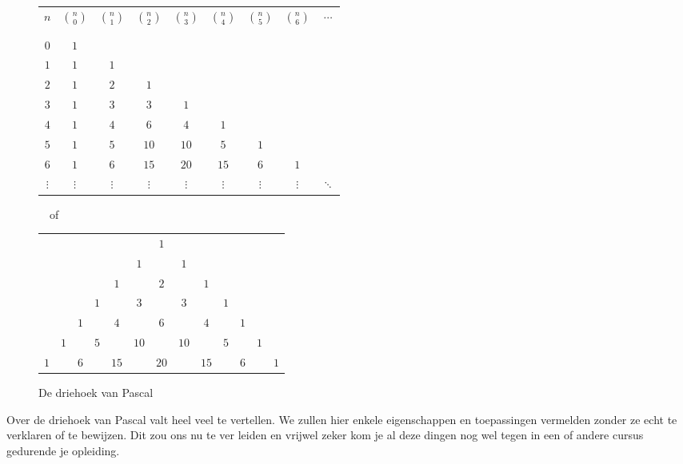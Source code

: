 \documentclass{ximera}
\begin{document}
\begin{figure}
\addtolength{\parindent}{-1.85cm}
\begin{tabular}{c|cccccccc}
$n$ & ${n\choose0}$ & ${n\choose1}$ & ${n\choose2}$ & ${n\choose3}$ & ${n\choose4}$ & ${n\choose5}$ & ${n\choose6}$ & $\cdots$ \\\\[-2.1ex]
\hline\\[-2.1ex]
$0$ & $1$ &  &  &  &  & & & \\
$1$ & $1$ & $1$ &  &  &  &  & &  \\
$2$ & $1$ & $2$ & $1$ &  &  &  & & \\
$3$ & $1$ & $3$ & $3$ & $1$ &  &  & & \\
$4$ & $1$ & $4$ & $6$ & $4$ & $1$ &  & & \\
$5$ & $1$ & $5$ & $10$ & $10$ & $5$ & $1$ & & \\
$6$ & $1$ & $6$ & $15$ & $20$ & $15$ & $6$ & $1$ & \\
$\vdots$ & $\vdots$ & $\vdots$ & $\vdots$ & $\vdots$ & $\vdots$ & $\vdots$ & $\vdots$ & $\ddots$
\end{tabular}
\ \ of\ \
\begin{tabular}{ccccccccccccc}
&&&&&& $1$ &&&&& \\
&&&&& $1$ && $1$ &&&&& \\
&&&& $1$ && $2$ && $1$ &&&& \\
&&& $1$ && $3$ && $3$ && $1$ &&& \\
&& $1$ && $4$ && $6$ && $4$ && $1$ && \\
& $1$ && $5$ && $10$ && $10$ && $5$  && $1$ & \\
$1$ && $6$ && $15$ && $20$ && $15$ && $6$ && $1$
\end{tabular}
\addtolength{\parindent}{+1.85cm} \caption{De driehoek van
Pascal}\label{M02_driehoek}
\end{figure}

Over de driehoek van Pascal valt heel veel te vertellen. We zullen
hier enkele eigenschappen en toepassingen vermelden zonder ze echt
te verklaren of te bewijzen. Dit zou ons nu te ver
leiden en vrijwel zeker kom je al deze dingen nog wel tegen in een
of andere cursus gedurende je opleiding.
\end{document}
